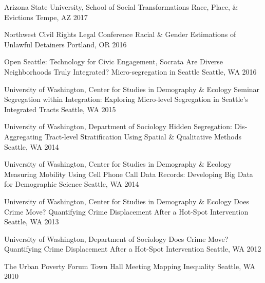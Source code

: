 \begin{cventries}
  \cventry
    {Arizona State University, School of Social Transformations} %
    {Race, Place, \& Evictions} %
    {Tempe, AZ} %
    {2017} %
    {}

  \cventry
    {Northwest Civil Rights Legal Conference} %
    {Racial \& Gender Estimations of Unlawful Detainers} %
    {Portland, OR} %
    {2016} %
    {}
    
  \cventry
    {Open Seattle: Technology for Civic Engagement, Socrata} %
    {Are Diverse Neighborhoods Truly Integrated? Micro-segregation in Seattle} %
    {Seattle, WA} %
    {2016} %
    {}
    
  \cventry
    {University of Washington, Center for Studies in Demography \& Ecology Seminar} %
    {Segregation within Integration: Exploring Micro-level Segregation in Seattle's Integrated Tracts} %
    {Seattle, WA} %
    {2015} %
    {}
    
  \cventry
    {University of Washington, Department of Sociology} %
    {Hidden Segregation: Dis-Aggregating Tract-level Stratification Using Spatial \& Qualitative Methods} %
    {Seattle, WA} %
    {2014} %
    {}
    
  \cventry
    {University of Washington, Center for Studies in Demography \& Ecology} %
    {Measuring Mobility Using Cell Phone Call Data Records: Developing Big Data for Demographic Science} %
    {Seattle, WA} %
    {2014} %
    {}
    
  \cventry
    {University of Washington, Center for Studies in Demography \& Ecology} %
    {Does Crime Move? Quantifying Crime Displacement After a Hot-Spot Intervention} %
    {Seattle, WA} %
    {2013} %
    {}
    
  \cventry
    {University of Washington, Department of Sociology} %
    {Does Crime Move? Quantifying Crime Displacement After a Hot-Spot Intervention} %
    {Seattle, WA} %
    {2012} %
    {}
    
  \cventry
    {The Urban Poverty Forum Town Hall Meeting} %
    {Mapping Inequality} %
    {Seattle, WA} %
    {2010} %
    {}


\end{cventries}

